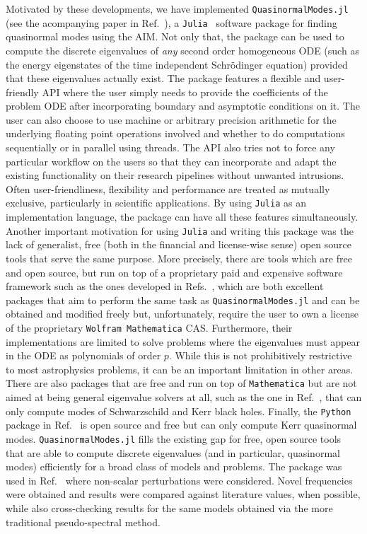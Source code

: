 Motivated by these developments, we have implemented \texttt{QuasinormalModes.jl} (see the acompanying paper in Ref.~\cite{Sanches2022}), a \texttt{Julia}~\cite{Bezanson2017} software package for finding quasinormal modes using the AIM. Not only that, the package can be used to compute the discrete eigenvalues of \emph{any} second order homogeneous ODE (such as the energy eigenstates of the time independent Schrödinger equation) provided that these eigenvalues actually exist. The package features a flexible and user-friendly API where the user simply needs to provide the coefficients of the problem ODE after incorporating boundary and asymptotic conditions on it. The user can also choose to use machine or arbitrary precision arithmetic for the underlying floating point operations involved and whether to do computations sequentially or in parallel using threads. The API also tries not to force any particular workflow on the users so that they can incorporate and adapt the existing functionality on their research pipelines without unwanted intrusions. Often user-friendliness, flexibility and performance are treated as mutually exclusive, particularly in scientific applications. By using \texttt{Julia} as an implementation language, the package can have all these features simultaneously. Another important motivation for using \texttt{Julia} and writing this package was the lack of generalist, free (both in the financial and license-wise sense) open source tools that serve the same purpose. More precisely, there are tools which are free and open source, but run on top of a proprietary paid and expensive software framework such as the ones developed in Refs.~\cite{qnmspectral,spectralbp}, which are both excellent packages that aim to perform the same task as \texttt{QuasinormalModes.jl} and can be obtained and modified freely but, unfortunately, require the user to own a license of the proprietary \texttt{Wolfram Mathematica} CAS. Furthermore, their implementations are limited to solve problems where the eigenvalues must appear in the ODE as polynomials of order $p$. While this is not prohibitively restrictive to most astrophysics problems, it can be an important limitation in other areas. There are also packages that are free and run on top of \texttt{Mathematica} but are not aimed at being general eigenvalue solvers at all, such as the one in Ref.~\cite{bhpt_quasinormalmodes}, that can only compute modes of Schwarzschild and Kerr black holes. Finally, the \texttt{Python} package in Ref.~\cite{bhpt_qnm} is open source and free but can only compute Kerr quasinormal modes. \texttt{QuasinormalModes.jl} fills the existing gap for free, open source tools that are able to compute discrete eigenvalues (and in particular, quasinormal modes) efficiently for a broad class of models and problems. The package was used in Ref.~\cite{Mamani2022} where non-scalar perturbations were considered. Novel frequencies were obtained and results were compared against literature values, when possible, while also cross-checking results for the same models obtained via the more traditional pseudo-spectral method.
